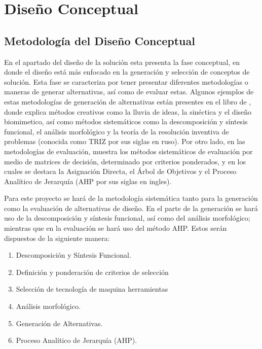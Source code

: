\chapter{Diseño Conceptual}

\section{Metodología del Diseño Conceptual}
En el apartado del diseño de la solución esta presenta la fase conceptual, en donde el diseño está más enfocado en la generación y selección de conceptos de solución. Esta fase se caracteriza por tener presentar diferentes metodologías o maneras de generar alternativas, así como de evaluar estas. Algunos ejemplos de estas metodologías de generación de alternativas están presentes en el libro de \cite{dieter2012engineering}, donde explica métodos creativos como la lluvia de ideas, la sinéctica y el diseño biomimetico, así como métodos sistemáticos como la descomposición y síntesis funcional, el análisis morfológico y la teoría de la resolución inventiva de problemas (conocida como TRIZ por sus siglas en ruso). Por otro lado, en las metodologías de evaluación, \cite{dieter2012engineering} muestra los métodos sistemáticos de evaluación por medio de matrices de decisión, determinado por criterios ponderados, y en los cuales se destaca la Asignación Directa, el Árbol de Objetivos y el Proceso Analítico de Jerarquía (AHP por sus siglas en ingles).

Para este proyecto se hará de la metodología sistemática tanto para la generación como la evaluación de alternativas de diseño. En el parte de la generación se hará uso de la descomposición y síntesis funcional, así como del análisis morfológico; mientras que en la evaluación se hará uso del método AHP. Estos serán dispuestos de la siguiente manera:

\begin{enumerate} \nosep
    \item Descomposición y Síntesis Funcional.
    \item Definición y ponderación de criterios de selección
    \item Selección de tecnología de maquina herramientas
    \item Análisis morfológico.
    \item Generación de Alternativas.
    \item Proceso Analítico de Jerarquía  (AHP).
\end{enumerate}

